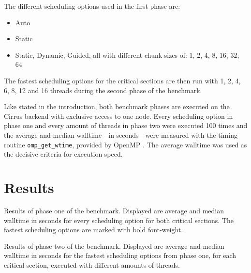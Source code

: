 \documentclass[twoside,11pt]{article}
\begin{document}
The different scheduling options used in the first phase
are:
\begin{itemize}
  \item Auto
  \item Static
  \item Static, Dynamic, Guided, all with different
    chunk sizes of: 1, 2, 4, 8, 16, 32, 64
\end{itemize}

The fastest scheduling options for the critical sections
are then run with 1, 2, 4, 6, 8, 12 and 16 threads during
the second phase of the benchmark.

Like stated in the introduction, both benchmark phases are
executed on the Cirrus backend with exclusive access to one
node.
Every scheduling option in phase one and every amount of
threads in phase two were executed 100 times and the
average and median walltime---in seconds---were measured
with the timing routine \texttt{omp\_get\_wtime}, provided
by OpenMP \citep[see][Chapter 3.4.1]{openmp}.
The average walltime was used as the decisive criteria for
execution speed.


\section{Results}


\begin{table}
\begin{center}

\caption{Results of phase one of the benchmark. Displayed
  are average and median walltime in seconds for every
  scheduling option for both critical sections. The fastest
  scheduling options are marked with bold font-weight.}
\end{center}
\end{table}

\begin{table}
\begin{center}

\caption{Results of phase two of the benchmark. Displayed
  are average and median walltime in seconds for the
  fastest scheduling options from phase one, for each
  critical section, executed with different amounts of
  threads.}
\end{center}
\end{table}
\end{document}
